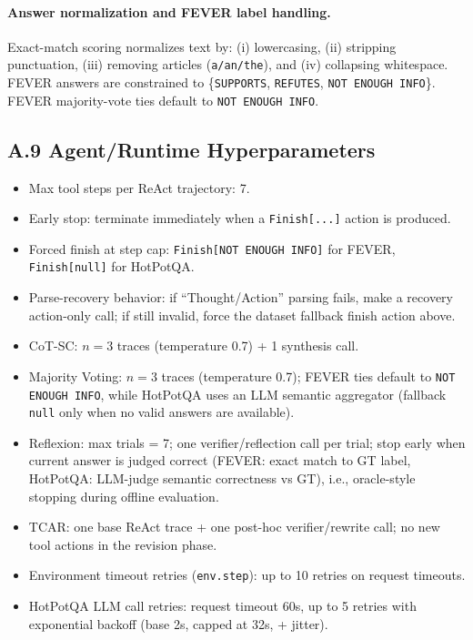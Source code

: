 \paragraph{Answer normalization and FEVER label handling.}
Exact-match scoring normalizes text by: (i) lowercasing, (ii) stripping punctuation, (iii) removing articles (\texttt{a/an/the}), and (iv) collapsing whitespace. FEVER answers are constrained to \{\texttt{SUPPORTS}, \texttt{REFUTES}, \texttt{NOT ENOUGH INFO}\}. FEVER majority-vote ties default to \texttt{NOT ENOUGH INFO}.

\subsection{A.9 Agent/Runtime Hyperparameters}
\begin{itemize}
\item Max tool steps per ReAct trajectory: 7.
\item Early stop: terminate immediately when a \texttt{Finish[...]} action is produced.
\item Forced finish at step cap:
  \texttt{Finish[NOT ENOUGH INFO]} for FEVER, \texttt{Finish[null]} for HotPotQA.
\item Parse-recovery behavior: if ``Thought/Action'' parsing fails, make a recovery action-only call; if still invalid, force the dataset fallback finish action above.
\item CoT-SC: $n=3$ traces (temperature 0.7) + 1 synthesis call.
\item Majority Voting: $n=3$ traces (temperature 0.7); FEVER ties default to \texttt{NOT ENOUGH INFO}, while HotPotQA uses an LLM semantic aggregator (fallback \texttt{null} only when no valid answers are available).
\item Reflexion: max trials = 7; one verifier/reflection call per trial; stop early when current answer is judged correct (FEVER: exact match to GT label, HotPotQA: LLM-judge semantic correctness vs GT), i.e., oracle-style stopping during offline evaluation.
\item TCAR: one base ReAct trace + one post-hoc verifier/rewrite call; no new tool actions in the revision phase.
\item Environment timeout retries (\texttt{env.step}): up to 10 retries on request timeouts.
\item HotPotQA LLM call retries: request timeout 60s, up to 5 retries with exponential backoff (base 2s, capped at 32s, + jitter).
\end{itemize}

